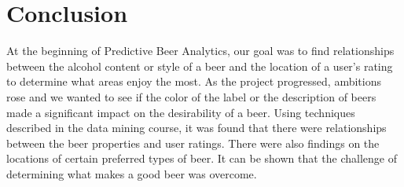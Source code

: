 \documentclass[10pt]{IEEEtran}
\begin{document}
\section{Conclusion}
At the beginning of Predictive Beer Analytics, our goal was to find relationships between the alcohol content or style of a beer and the location of a user's rating to determine what areas enjoy the most. As the project progressed, ambitions rose and we wanted to see if the color of the label or the description of beers made a significant impact on the desirability of a beer. Using techniques described in the data mining course, it was found that there were relationships between the beer properties and user ratings. There were also findings on the locations of certain preferred types of beer. It can be shown that the challenge of determining what makes a good beer was overcome.





\clearpage
\onecolumn
\appendices
\end{document}
